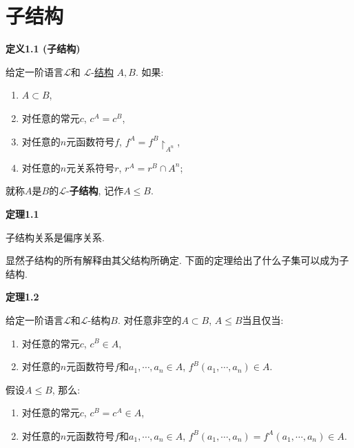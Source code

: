 


\setlength{\abovedisplayskip}{1pt}
\setlength{\belowdisplayskip}{1pt}

\section{子结构}

\hypertarget{sec:定义1.1}{}
\noindent\textbf{定义1.1 (子结构)}

给定一阶语言$\mathcal{L}$和
$\mathcal{L}$-\href{01 一阶语言的结构#nameddest=sec:定义1.1}{结构} $A,B$. 如果:
\begin{enumerate}
    \item $A\subset B$,
    \item 对任意的常元$c$, $c^A=c^B$,
    \item 对任意的$n$元函数符号$f$, $f^A=f^B\!\restriction_{A^n}$,
    \item 对任意的$n$元关系符号$r$, $r^A=r^B\cap A^n$;
\end{enumerate}
就称$A$是$B$的$\mathcal{L}$-\textbf{子结构}, 记作$A\leqslant B$.

\vspace{10pt}

\hypertarget{sec:定理1.1}{}
\noindent\textbf{定理1.1}

子结构关系是偏序关系.

\vspace{10pt}

显然子结构的所有解释由其父结构所确定. 下面的定理给出了什么子集可以成为子结构.

\vspace{10pt}

\hypertarget{sec:定理1.2}{}
\noindent\textbf{定理1.2}

给定一阶语言$\mathcal{L}$和$\mathcal{L}$-结构$B$.
对任意非空的$A\subset B$, $A\leqslant B$当且仅当:
\begin{enumerate}
    \item 对任意的常元$c$, $c^B\in A$,
    \item 对任意的$n$元函数符号$f$和$a_1,\cdots,a_n\in A$, $f^B(a_1,\cdots,a_n)\in A$.
\end{enumerate}



假设$A\leqslant B$, 那么:
\begin{enumerate}
    \item 对任意的常元$c$, $c^B=c^A\in A$,
    \item 对任意的$n$元函数符号$f$和$a_1,\cdots,a_n\in A$,
    $f^B(a_1,\cdots,a_n)=f^A(a_1,\cdots,a_n)\in A$.
\end{enumerate}

